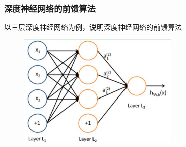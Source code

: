 {{\frame
{
	\frametitle{深度神经网络的前馈算法}
	以三层深度神经网络为例，说明深度神经网络的前馈算法
\begin{figure}[h!]
\centering
\includegraphics[width=3.0in]{Figures/DNN_front_pro.jpg}
\label{Fig:DNN_front_pro}
\end{figure}
}

}}
